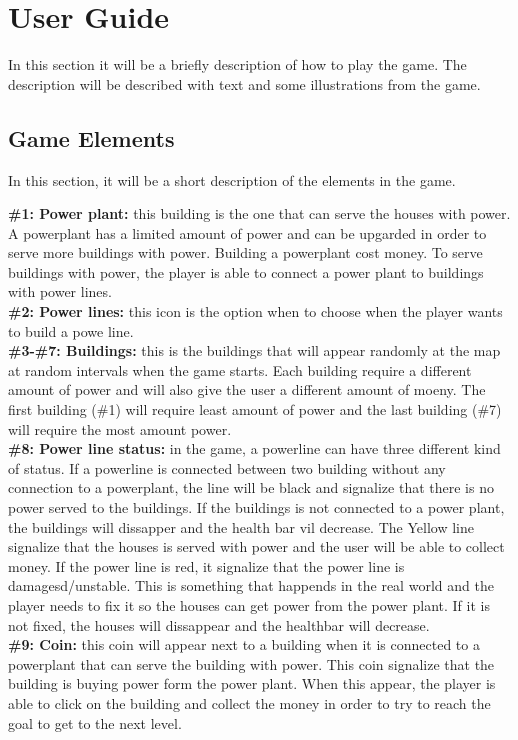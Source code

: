 \chapter{User Guide}

In this section it will be a briefly description of how to play the game.
The description will be described with text and some illustrations from the
game. 

\clearpage

\section{Game Elements}
	In this section, it will be a short description of the elements in the game.

	{\bf \#1: Power plant:} this building is the one that can serve the houses
	with power. A powerplant has a limited amount of power and can be upgarded
	in order to serve more buildings with power. Building a powerplant cost money.
	To serve buildings with power, the player is able to connect a power plant to
	buildings with power lines. \\
	{\bf \#2: Power lines: } this icon is the option when to choose when the player
	wants to build a powe line. \\
	{\bf \#3-\#7: Buildings: } this is the buildings that will appear randomly at the
	map at random intervals when the game starts. Each building require a different 
	amount of power and will also give the user a different amount of moeny. 
	The first building (\#1) will require least amount of power and the last building
	(\#7) will require the most amount power. \\
	{\bf \#8: Power line status:} in the game, a powerline can have three different kind
	of status. If a powerline is connected between two building without any connection
	to a powerplant, the line will be black and signalize that there is no power served
	to the buildings. If the buildings is not connected to a power plant, the buildings
	will dissapper and the health bar vil decrease. The Yellow line signalize that the
	houses is served with power and the user will be able to collect money. If the 
	power line is red, it signalize that the power line is damagesd/unstable. This is
	something that happends in the real world and the player needs to fix it so the
	houses can get power from the power plant. If it is not fixed, the houses will 
	dissappear and the healthbar will decrease. \\ 
	{\bf \#9: Coin: } this coin will appear next to a building when it is connected to
	a powerplant that can serve the building with power. This coin signalize that
	the building is buying power form the power plant. When this appear, the player
	is able to click on the building and collect the money in order to try to 
	reach the goal to get to the next level. 

